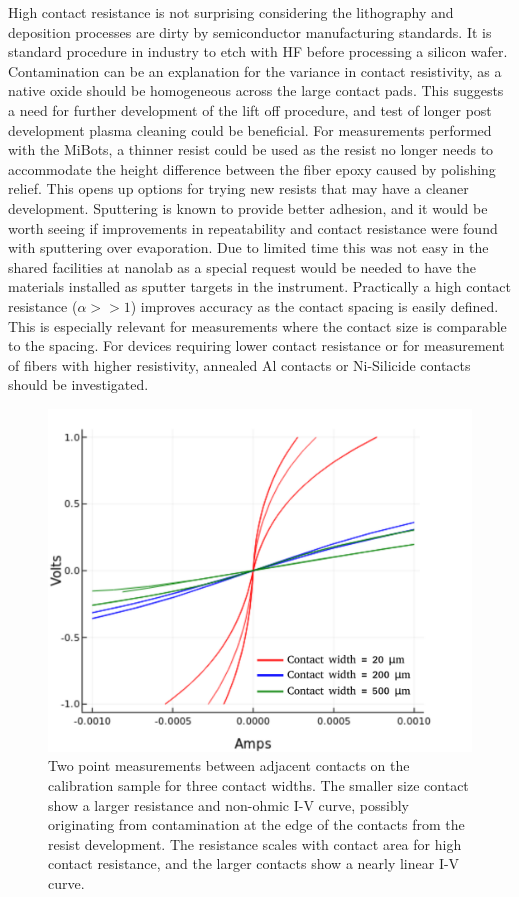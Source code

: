 High contact resistance is not surprising considering the lithography and deposition processes are dirty by semiconductor manufacturing standards. It is standard procedure in industry to etch with HF before processing a silicon wafer. Contamination can be an explanation for the variance in contact resistivity, as a native oxide should be homogeneous across the large contact pads. This suggests a need for further development of the lift off procedure, and test of longer post development plasma cleaning could be beneficial. For measurements performed with the MiBots, a thinner resist could be used as the resist no longer needs to accommodate the height difference between the fiber epoxy caused by polishing relief. This opens up options for trying new resists that may have a cleaner development. Sputtering is known to provide better adhesion, and it would be worth seeing if improvements in repeatability and contact resistance were found with sputtering over evaporation. Due to limited time this was not easy in the shared facilities at nanolab as a special request would be needed to have the materials installed as sputter targets in the instrument. Practically a high contact resistance ($\alpha >> 1 $) improves accuracy as the contact spacing is easily defined. This is especially relevant for measurements where the contact size is comparable to the spacing. For devices requiring lower contact resistance or for measurement of fibers with higher resistivity, annealed Al contacts or Ni-Silicide contacts should be investigated. 


\begin{figure}
    \centering
    \includegraphics[width=.6\textwidth]{fig/Results/contact_resistance_comparison.png}
    \caption{Two point measurements between adjacent contacts on the calibration sample for three contact widths. The smaller size contact show a larger resistance and non-ohmic I-V curve, possibly originating from contamination at the edge of the contacts from the resist development. The resistance scales with contact area for high contact resistance, and the larger contacts show a nearly linear I-V curve. }
    \label{fig:calibration_2pnt}
\end{figure}
\FloatBarrier

